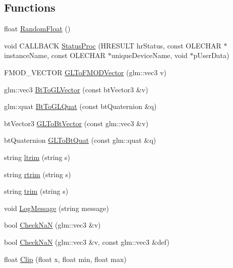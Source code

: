 \subsection*{Functions}
\begin{DoxyCompactItemize}
\item 
float \hyperlink{namespace_b_g_e_adc7c9e5cd854fcfc95dc113829de71ec}{Random\-Float} ()
\item 
void C\-A\-L\-L\-B\-A\-C\-K \hyperlink{namespace_b_g_e_afd2a1d8dea16a8c6e26e1b161e1c3758}{Status\-Proc} (H\-R\-E\-S\-U\-L\-T hr\-Status, const O\-L\-E\-C\-H\-A\-R $\ast$instance\-Name, const O\-L\-E\-C\-H\-A\-R $\ast$unique\-Device\-Name, void $\ast$p\-User\-Data)
\item 
F\-M\-O\-D\-\_\-\-V\-E\-C\-T\-O\-R \hyperlink{namespace_b_g_e_a1176d21c3f2c245052b152aa77826f60}{G\-L\-To\-F\-M\-O\-D\-Vector} (glm\-::vec3 v)
\item 
glm\-::vec3 \hyperlink{namespace_b_g_e_a7164f364e9eec84829d0ea2206731895}{Bt\-To\-G\-L\-Vector} (const bt\-Vector3 \&v)
\item 
glm\-::quat \hyperlink{namespace_b_g_e_aa9f49a8e2cec4d7811398f243475abbf}{Bt\-To\-G\-L\-Quat} (const bt\-Quaternion \&q)
\item 
bt\-Vector3 \hyperlink{namespace_b_g_e_a721a46c8618bcd3b8a72138f45211e10}{G\-L\-To\-Bt\-Vector} (const glm\-::vec3 \&v)
\item 
bt\-Quaternion \hyperlink{namespace_b_g_e_a57f8f67a5520cfbe967e4f91f02138e9}{G\-L\-To\-Bt\-Quat} (const glm\-::quat \&q)
\item 
string \hyperlink{namespace_b_g_e_ab0424dbb7fe523b80f6b0263b1d2fe5f}{ltrim} (string s)
\item 
string \hyperlink{namespace_b_g_e_a2485e47315736fd27e76f03a0d3c66ec}{rtrim} (string s)
\item 
string \hyperlink{namespace_b_g_e_a65bfe22b3a4b03bf32837ac39a8a6aaf}{trim} (string s)
\item 
void \hyperlink{namespace_b_g_e_a04062588c9f02e8fda67f52bb349162d}{Log\-Message} (string message)
\item 
bool \hyperlink{namespace_b_g_e_a3e44220909ce0c540f52ec4eba240e10}{Check\-Na\-N} (glm\-::vec3 \&v)
\item 
bool \hyperlink{namespace_b_g_e_aca61b9423894ceed2b7ba003836ef673}{Check\-Na\-N} (glm\-::vec3 \&v, const glm\-::vec3 \&def)
\item 
float \hyperlink{namespace_b_g_e_ad302842b2584198d7cffd196c3cf3c15}{Clip} (float x, float min, float max)
\item 

\end{DoxyCompactItemize}
